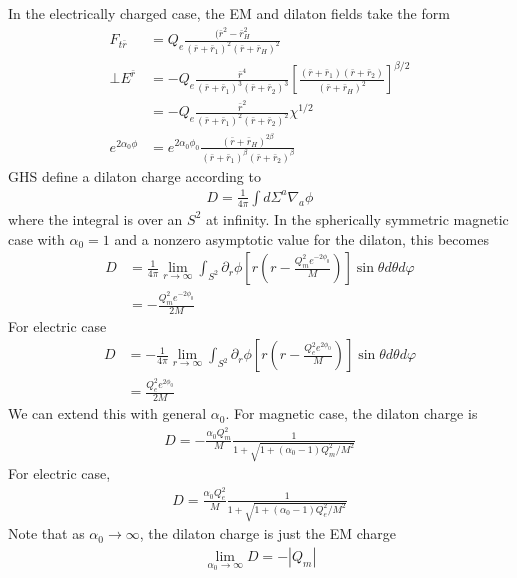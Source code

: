 \documentclass[%
 reprint,
 amsmath,amssymb,
 aps,
]{revtex4-1}
\begin{document}
In the electrically charged case, the EM and dilaton fields take the form
\begin{align}
F_{t \bar{r}} &= Q_e \frac{(\bar{r}^2 - \bar{r}_H^2}{(\bar{r}+\bar{r}_1)^2 (\bar{r}+\bar{r}_H)^2} \\
\bot E^{\bar{r}} &= -Q_e \frac{\bar{r}^4}{(\bar{r} + \bar{r}_1)^3 (\bar{r}+\bar{r}_2)^3} \left[\frac{(\bar{r}+\bar{r}_1)(\bar{r}+\bar{r}_2)}{(\bar{r}+\bar{r}_H)^2} \right]^{\beta/2} \nonumber \\
&= -Q_e \frac{\bar{r}^2}{(\bar{r}+\bar{r}_1)^2(\bar{r}+\bar{r}_2)^2} \chi^{1/2} \\
e^{2 \alpha_0 \phi} &= e^{2 \alpha_0 \phi_0} \frac{(\bar{r}+\bar{r}_H)^{2 \beta}}{(\bar{r}+\bar{r}_1)^\beta (\bar{r} + \bar{r}_2)^\beta}
\end{align}
GHS define a dilaton charge according to
\begin{align}
D = \frac{1}{4\pi} \int d\Sigma^a \nabla_a \phi
\end{align}
where the integral is over an $S^2$ at infinity. In the spherically symmetric magnetic case with $\alpha_0=1$ and a nonzero asymptotic value for the dilaton, this becomes
\begin{align}
D &= \frac{1}{4\pi} \lim_{r \to \infty} \int_{S^2} \partial_r \phi \left[ r \left(r-\frac{Q_m^2 e^{-2\phi_0}}{M} \right) \right] \sin \theta d \theta d \varphi \nonumber \\
&= -\frac{Q_m^2 e^{-2 \phi_0}}{2M}
\end{align}
For electric case
\begin{align}
D &= - \frac{1}{4\pi} \lim_{r \to \infty} \int_{S^2} \partial_r \phi \left[ r \left(r-\frac{Q_e^2 e^{2\phi_0}}{M} \right) \right] \sin \theta d \theta d \varphi \nonumber \\
&= \frac{Q_e^2 e^{2 \phi_0}}{2M}
\end{align}
We can extend this with general $\alpha_0$. For magnetic case, the dilaton charge is
\begin{align}
D = -\frac{\alpha_0 Q_m^2}{M} \frac{1}{1+\sqrt{1+(\alpha_0-1)Q^2_m/M^2}}
\end{align}
For electric case,
\begin{align}
D = \frac{\alpha_0 Q_e^2}{M} \frac{1}{1+\sqrt{1+(\alpha_0-1)Q^2_e/M^2}}
\end{align}
Note that as $\alpha_0 \rightarrow \infty$, the dilaton charge is just the EM charge
\begin{align}
\lim_{\alpha_0 \to \infty} D = - | Q_m |
\end{align}
\end{document}
